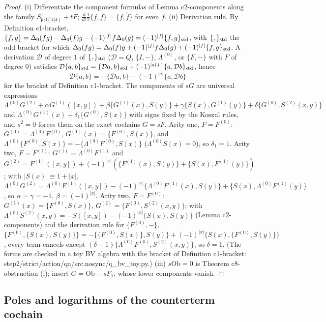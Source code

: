 \documentclass[11pt]{article}
\numberwithin{equation}{section}
\theoremstyle{plain}
\theoremstyle{definition}
\newcommand{\Ob}{\mathrm{Ob}}
\begin{document}
\begin{proof}
(i) Differentiate the component formulas of Lemma c2-components along the family $S_{\mathfrak{psl}(4|4)}+tF$; $\tfrac{d}{dt}\tfrac12\{f,f\}=\{f,\dot f\}$ for even $f$. (ii) Derivation rule. By Definition c1-bracket, $\{f,g\}=\Delta_0(fg)-\Delta_0(f)g-(-1)^{|f|}f\Delta_0(g)=(-1)^{|f|}\{f,g\}_{\rm std}$, with $\{,\}_{\rm std}$ the odd bracket for which $\Delta_0(fg)=\Delta_0(f)g+(-1)^{|f|}f\Delta_0(g)+(-1)^{|f|}\{f,g\}_{\rm std}$. A derivation $\mathcal D$ of degree $1$ of $\{,\}_{\rm std}$ ($\mathcal D=Q$, $\{I,-\}$, $\Lambda^{(0)}$, or $\{F,-\}$ with $F$ of degree $0$) satisfies $\mathcal D\{a,b\}_{\rm std}=\{\mathcal Da,b\}_{\rm std}+(-1)^{|a|+1}\{a,\mathcal Db\}_{\rm std}$, hence
\[
\mathcal D\{a,b\}=-\{\mathcal Da,b\}-(-1)^{|a|}\{a,\mathcal Db\}
\]
for the bracket of Definition c1-bracket. The components of $sG$ are universal expressions $\Lambda^{(0)}G^{(2)}+\alpha G^{(1)}([x,y])+\beta\{G^{(1)}(x),S(y)\}+\gamma\{S(x),G^{(1)}(y)\}+\delta\{G^{(0)},S^{(2)}(x,y)\}$ and $\Lambda^{(0)}G^{(1)}(x)+\delta_1\{G^{(0)},S(x)\}$ with signs fixed by the Koszul rules, and $s^2=0$ forces them on the exact cochains $G=sF$. Arity one, $F=F^{(0)}$: $G^{(0)}=\Lambda^{(0)}F^{(0)}$, $G^{(1)}(x)=\{F^{(0)},S(x)\}$, and $\Lambda^{(0)}\{F^{(0)},S(x)\}=-\{\Lambda^{(0)}F^{(0)},S(x)\}$ ($\Lambda^{(0)}S(x)=0$), so $\delta_1=1$. Arity two, $F=F^{(1)}$: $G^{(1)}=\Lambda^{(0)}F^{(1)}$ and $G^{(2)}=F^{(1)}([x,y])+(-1)^{|x|}(\{F^{(1)}(x),S(y)\}+\{S(x),F^{(1)}(y)\})$; with $|S(x)|\equiv1+|x|$, $\Lambda^{(0)}G^{(2)}=\Lambda^{(0)}F^{(1)}([x,y])-(-1)^{|x|}\{\Lambda^{(0)}F^{(1)}(x),S(y)\}+\{S(x),\Lambda^{(0)}F^{(1)}(y)\}$, so $\alpha=\gamma=-1$, $\beta=(-1)^{|x|}$. Arity two, $F=F^{(0)}$: $G^{(1)}(x)=\{F^{(0)},S(x)\}$, $G^{(2)}=\{F^{(0)},S^{(2)}(x,y)\}$; with $\Lambda^{(0)}S^{(2)}(x,y)=-S([x,y])-(-1)^{|x|}\{S(x),S(y)\}$ (Lemma c2-components) and the derivation rule for $\{F^{(0)},-\}$, $\{F^{(0)},\{S(x),S(y)\}\}=-\{\{F^{(0)},S(x)\},S(y)\}+(-1)^{|x|}\{S(x),\{F^{(0)},S(y)\}\}$, every term cancels except $(\delta-1)\{\Lambda^{(0)}F^{(0)},S^{(2)}(x,y)\}$, so $\delta=1$. (The forms are checked in a toy BV algebra with the bracket of Definition c1-bracket: step2/strict/action/qa/src.nosync/q\_bv\_toy.py.) (iii) $s\Ob=0$ is Theorem c8-obstruction (i); insert $G=\Ob-sF_1$, whose lower components vanish.
\end{proof}

\subsection{Poles and logarithms of the counterterm cochain}
\end{document}
